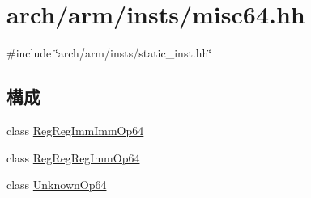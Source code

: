 \hypertarget{misc64_8hh}{
\section{arch/arm/insts/misc64.hh}
\label{misc64_8hh}
}
{\ttfamily \#include \char`\"{}arch/arm/insts/static\_\-inst.hh\char`\"{}}\par
\subsection*{構成}
\begin{DoxyCompactItemize}
\item 
class \hyperlink{classRegRegImmImmOp64}{RegRegImmImmOp64}
\item 
class \hyperlink{classRegRegRegImmOp64}{RegRegRegImmOp64}
\item 
class \hyperlink{classUnknownOp64}{UnknownOp64}
\end{DoxyCompactItemize}
